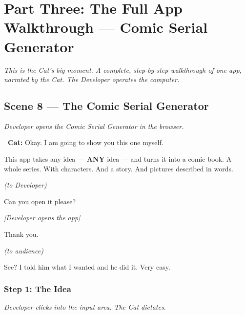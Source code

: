 \documentclass[12pt, letterpaper]{article}
\newcommand{\cat}{\textbf{\color{catpink}\faIcon{cat}\ Cat:}}
\newcommand{\stage}[1]{%
    \begin{stagebox}%
      \textit{\color{black!60}#1}%
    \end{stagebox}%
  }
\begin{document}
  \section{Part Three: The Full App Walkthrough — Comic Serial Generator}

  \begin{center}
    \textit{\large This is the Cat's big moment. A complete, step-by-step
    walkthrough of one app, narrated by the Cat. The Developer operates the
    computer.}
  \end{center}

  \subsection{Scene 8 — The Comic Serial Generator}

  \stage{Developer opens the Comic Serial Generator in the browser.}

  \begin{catbox}
    \cat{} \large Okay. I am going to show you this one myself.

    \medskip
    {\large This app takes any idea — \textbf{ANY} idea — and turns it into a
    comic book. A whole series. With characters. And a story. And pictures
    described in words.}

    \medskip
    {\large\textit{(to Developer)}}

    \medskip
    {\large Can you open it please?}

    \medskip
    {\large\textit{[Developer opens the app]}}

    \medskip
    {\large Thank you.}

    \medskip
    {\large\textit{(to audience)}}

    \medskip
    {\large See? I told him what I wanted and he did it. Very easy.}
  \end{catbox}

  \subsubsection{Step 1: The Idea}

  \stage{Developer clicks into the input area. The Cat dictates.}
\end{document}
